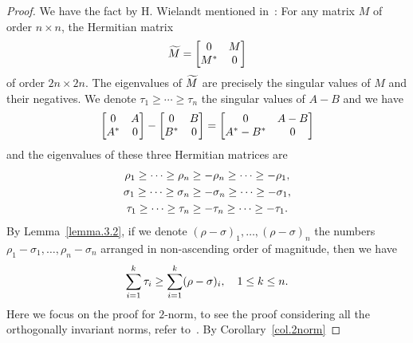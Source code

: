 \begin{proof}
    We have the fact by H. Wielandt mentioned in~: For any matrix $M$ of order $n\times n$, the Hermitian matrix 
    \begin{equation}\notag
        \widetilde M = 
        \begin{bmatrix}
            0 & M\\
            M^* & 0
        \end{bmatrix}
    \end{equation}
    of order $2n\times 2n$. The eigenvalues of $\widetilde M$ are precisely the singular values of $M$ and their negatives. We denote $\tau_1 \geq \cdots \geq \tau_n$ the singular values of $A-B$ and we have 
    \begin{equation}\notag
        \begin{bmatrix}
            0 & A \\
            A^* & 0
        \end{bmatrix}
        -
        \begin{bmatrix}
            0 & B\\
            B^* & 0
        \end{bmatrix}
        =
        \begin{bmatrix}
            0 & A-B\\
            A^* - B^* & 0
        \end{bmatrix}
    \end{equation}
    and the eigenvalues of these three Hermitian matrices are 
    \begin{equation}\notag
        \begin{aligned}
            \rho_1\geq\cdots\geq\rho_n &\geq -\rho_n\geq \cdots\geq -\rho_1, \\
            \sigma_1\geq\cdots\geq\sigma_n&\geq -\sigma_n\geq \cdots\geq -\sigma_1, \\
            \tau_1\geq\cdots\geq\tau_n&\geq -\tau_n\geq \cdots\geq -\tau_1.
        \end{aligned}
    \end{equation}
    By Lemma~\ref{lemma.3.2}, if we denote $(\rho-\sigma)_1,\dots,(\rho-\sigma)_n$ the numbers $\rho_1 -\sigma_1,\dots,\rho_n-\sigma_n$ arranged in non-ascending order of magnitude, then we have 
    \begin{equation}\notag
        \sum_{i=1}^k \tau_i \geq \sum_{i=1}^k (\rho - \sigma)_i,\quad 1\leq k \leq n.
    \end{equation}
    Here we focus on the proof for $2$-norm, to see the proof considering all the orthogonally invariant norms, refer to~. By Corollary~\ref{col.2norm}

\end{proof}
